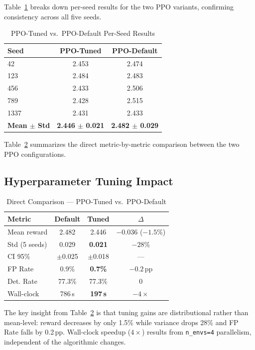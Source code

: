 \documentclass[conference]{IEEEtran}
\begin{document}
Table~\ref{tab:seeds} breaks down per-seed results for the two PPO
variants, confirming consistency across all five seeds.

\begin{table}[htbp]
\caption{PPO-Tuned vs.\ PPO-Default Per-Seed Results}
\label{tab:seeds}
\centering
\small
\begin{tabular}{lcc}
\toprule
\textbf{Seed} & \textbf{PPO-Tuned} & \textbf{PPO-Default} \\
\midrule
42   & 2.453 & 2.474 \\
123  & 2.484 & 2.483 \\
456  & 2.433 & 2.506 \\
789  & 2.428 & 2.515 \\
1337 & 2.431 & 2.433 \\
\midrule
\textbf{Mean $\pm$ Std} & \textbf{2.446 $\pm$ 0.021} & \textbf{2.482 $\pm$ 0.029} \\
\bottomrule
\end{tabular}
\end{table}

Table~\ref{tab:tuning} summarizes the direct metric-by-metric comparison
between the two PPO configurations.

\subsection{Hyperparameter Tuning Impact}

\begin{table}[htbp]
\caption{Direct Comparison --- PPO-Tuned vs.\ PPO-Default}
\label{tab:tuning}
\centering
\small
\begin{tabular}{lccc}
\toprule
\textbf{Metric} & \textbf{Default} & \textbf{Tuned} & \textbf{$\Delta$} \\
\midrule
Mean reward     & 2.482 & 2.446 & $-0.036$ ($-1.5\%$) \\
Std (5 seeds)   & 0.029 & \textbf{0.021} & $-28\%$ \\
CI 95\%         & $\pm$0.025 & $\pm$0.018 & --- \\
FP Rate         & 0.9\% & \textbf{0.7\%} & $-0.2$\,pp \\
Det. Rate       & 77.3\% & 77.3\% & 0 \\
Wall-clock      & 786\,s & \textbf{197\,s} & $-4\times$ \\
\bottomrule
\end{tabular}
\end{table}

The key insight from Table~\ref{tab:tuning} is that tuning gains are
distributional rather than mean-level: reward decreases by only 1.5\%
while variance drops 28\% and FP Rate falls by 0.2\,pp.
Wall-clock speedup ($4\times$) results from \texttt{n\_envs=4} parallelism,
independent of the algorithmic changes.
\end{document}
